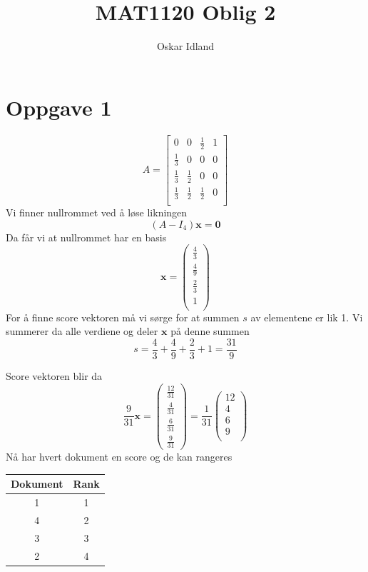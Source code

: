 \documentclass{article}
\author{Oskar Idland}
\title{MAT1120 Oblig 2}
\date{}
\begin{document}
\maketitle
\newpage

\section*{Oppgave 1}
  \[
  A = \begin{bmatrix}
   0 & 0 & \frac{1}{2} & 1 \\[1.1em]
   \frac{1}{3} & 0 & 0 & 0 \\[1.1em]
   \frac{1}{3} & \frac{1}{2} & 0 & 0 \\[1.1em]
   \frac{1}{3} & \frac{1}{2} & \frac{1}{2} & 0 \\ 
  \end{bmatrix}
  \]
Vi finner nullrommet ved å løse likningen 
\[
(A - I_4) \mathbf{x} = \mathbf 0 
\]
Da får vi at nullrommet har en basis 
\[
\mathbf{x} = \begin{pmatrix}
 \frac{4}{3} \\[.5em]
 \frac{4}{9} \\[.5em] 
 \frac{2}{3} \\[.5em]
 1 \\
\end{pmatrix}
\]
For å finne score vektoren må vi sørge for at summen $ s $ av elementene er lik 1. Vi summerer da alle verdiene og deler $ \mathbf{x} $ på denne summen
\[
s = \frac{4}{3} + \frac{4}{9} + \frac{2}{3} + 1 = \frac{31}{9}
\]


Score vektoren blir da 
\[
\frac{9}{31} \mathbf{x} = 
\begin{pmatrix}
\frac{12}{31}\\[.5em]
\frac{4}{31}\\[.5em]
\frac{6}{31}\\[.5em]
\frac{9}{31}
\end{pmatrix} = 
\frac{1}{31} 
\begin{pmatrix*}
 12 \\
 4 \\
 6 \\
 9 \\
\end{pmatrix*}
\]
Nå har hvert dokument en score og de kan rangeres 

\begin{center}
    \begin{tabular}{|c|*{1}{c|}}
        \hline
        Dokument & Rank \\
        \hline
        1 & 1\\
        \hline
        4 & 2 \\
        \hline
        3 & 3\\
        \hline
        2 & 4\\
        \hline
        \end{tabular}
\end{center}
\end{document}

